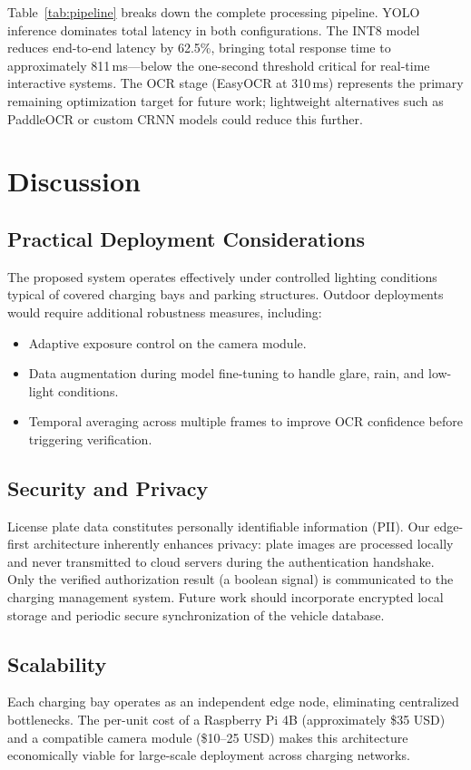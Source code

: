\documentclass[conference]{IEEEtran}
\begin{document}
Table~\ref{tab:pipeline} breaks down the complete processing pipeline. YOLO inference dominates total latency in both configurations. The INT8 model reduces end-to-end latency by 62.5\%, bringing total response time to approximately 811\,ms---below the one-second threshold critical for real-time interactive systems. The OCR stage (EasyOCR at 310\,ms) represents the primary remaining optimization target for future work; lightweight alternatives such as PaddleOCR or custom CRNN models could reduce this further.

\section{Discussion}

\subsection{Practical Deployment Considerations}
The proposed system operates effectively under controlled lighting conditions typical of covered charging bays and parking structures. Outdoor deployments would require additional robustness measures, including:
\begin{itemize}
\item Adaptive exposure control on the camera module.
\item Data augmentation during model fine-tuning to handle glare, rain, and low-light conditions.
\item Temporal averaging across multiple frames to improve OCR confidence before triggering verification.
\end{itemize}

\subsection{Security and Privacy}
License plate data constitutes personally identifiable information (PII). Our edge-first architecture inherently enhances privacy: plate images are processed locally and never transmitted to cloud servers during the authentication handshake. Only the verified authorization result (a boolean signal) is communicated to the charging management system. Future work should incorporate encrypted local storage and periodic secure synchronization of the vehicle database.

\subsection{Scalability}
Each charging bay operates as an independent edge node, eliminating centralized bottlenecks. The per-unit cost of a Raspberry Pi 4B (approximately \$35 USD) and a compatible camera module (\$10--25 USD) makes this architecture economically viable for large-scale deployment across charging networks.
\end{document}
